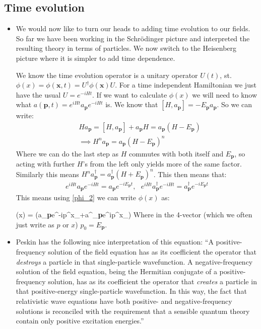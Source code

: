 \documentclass[11pt]{article}
\renewenvironment{flalign}{\vspace{-2mm}\empheq[box=\tcbhighmath]{align}}{\endempheq}
\numberwithin{equation}{section}
\begin{document}
\subsection{Time evolution}
\begin{itemize}
  \item We would now like to turn our heads to adding time evolution to our fields. So far we have been working in the Schr\"odinger picture and interpreted the resulting theory in terms of particles. We now switch to the Heisenberg picture where it is simpler to add time dependence. 

  We know the time evolution operator is a unitary operator $U(t)$, st. $\phi(x) = \phi(\textbf{x},t) = U^{\dagger}\phi(\textbf{x})U$. For a time independent Hamiltonian we just have the usual $U = e^{-iHt}$. If we want to calculate $\phi(x)$ we will need to know what $a(\textbf{p},t) = e^{iHt}a_{\textbf{p}}e^{-iHt}$ is. We know that $[H,a_{\textbf{p}}] = -E_{\textbf{p}}a_{\textbf{p}}$. So we can write:
  \begin{equation*}
  \begin{split}
  & Ha_{\textbf{p}} = [H,a_{\textbf{p}}]+a_{\textbf{p}}H = a_{\textbf{p}}(H-E_{\textbf{p}}) \\ 
  & \implies H^na_{\textbf{p}} = a_{\textbf{p}}(H-E_{\textbf{p}})^n
  \end{split} 
  \end{equation*}
  Where we can do the last step as $H$ commutes with both itself and $E_{\textbf{p}}$, so acting with further $H$'s from the left only yields more of the same factor. Similarly this means $H^na^{\dagger}_{\textbf{p}} = a^{\dagger}_{\textbf{p}}(H+E_{\textbf{p}})^n$. This then means that: 
\begin{align}
\label{a_H}
  e^{iHt}a_{\textbf{p}}e^{-iHt} = a_{\textbf{p}}e^{-iE_{\textbf{p}}t},~~~e^{iHt}a^{\dagger}_{\textbf{p}}e^{-iHt} = a^{\dagger}_{\textbf{p}}e^{-iE_{\textbf{p}}t}
\end{align}
  This means using \ref{phi_2} we can write $\phi(x)$ as:

  \begin{flalign}
  \label{phi_3}
  \phi(x) = \int {}\left(a_{\textbf{p}}e^{-ip^{\mu}x_{\mu}}+a^{\dagger}_{\textbf{p}}e^{ip^{\mu}x_{\mu}}\right) 
  \end{flalign}
  Where in the 4-vector (which we often just write as $p$ or $x$) $p_{0} = E_{\textbf{p}}$. 

  \item Peskin has the following nice interpretation of this equation: ``A positive-frequency solution of the field equation has as its coefficient the operator that \emph{destroys} a particle in that single-particle wavefunction. A negative-frequency solution of the field equation, being the Hermitian conjugate of a positive-frequency solution, has as its coefficient the operator that \emph{creates} a particle in that positive-energy single-particle wavefunction. In this way, the fact that relativistic wave equations have both positive- and negative-frequency solutions is reconciled with the requirement that a sensible quantum theory contain only positive excitation energies.'' 


\end{itemize}
\end{document}
